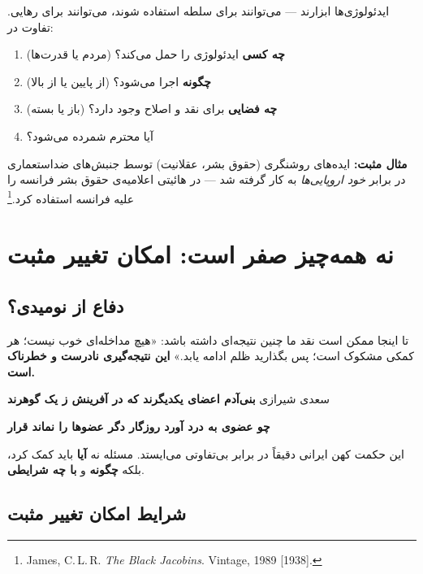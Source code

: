 \begin{tcolorbox}[successbox, title={پاسخ کوتاه: نه}]
ایدئولوژی‌ها ابزارند — می‌توانند برای سلطه استفاده شوند، می‌توانند برای
رهایی. تفاوت در:
\begin{enumerate}
\item \textbf{چه کسی} ایدئولوژی را حمل می‌کند؟ (مردم یا قدرت‌ها)
\item \textbf{چگونه} اجرا می‌شود؟ (از پایین یا از بالا)
\item \textbf{چه فضایی} برای نقد و اصلاح وجود دارد؟ (باز یا بسته)
\item آیا  محترم شمرده می‌شود؟
\end{enumerate}
\textbf{مثال مثبت:} ایده‌های روشنگری (حقوق بشر، عقلانیت) توسط جنبش‌های
ضداستعماری در برابر \textit{خود اروپایی‌ها} به کار گرفته شد —
 در هائیتی اعلامیه‌ی حقوق بشر فرانسه را علیه
فرانسه استفاده کرد.\footnote{James, C.\,L.\,R. \textit{The Black
Jacobins}. Vintage, 1989 [1938].}
\end{tcolorbox}


\section{نه همه‌چیز صفر است: امکان تغییر مثبت}
\label{sec:ch15-not-all-zero}

\subsection{دفاع از نومیدی؟}

تا اینجا ممکن است نقد ما چنین نتیجه‌ای داشته باشد: «هیچ مداخله‌ای خوب
نیست؛ هر کمکی مشکوک است؛ پس بگذارید ظلم ادامه یابد.»
\textbf{این نتیجه‌گیری نادرست و خطرناک است.}

\begin{histQuote}{سعدی شیرازی}
\textbf{بنی‌آدم اعضای یکدیگرند \quad که در آفرینش ز یک گوهرند}

\textbf{چو عضوی به درد آورد روزگار \quad دگر عضوها را نماند قرار}

این حکمت کهن ایرانی دقیقاً در برابر بی‌تفاوتی می‌ایستد. مسئله نه
\textbf{آیا} باید کمک کرد، بلکه \textbf{چگونه} و \textbf{با چه شرایطی}.
\end{histQuote}


\subsection{شرایط امکان تغییر مثبت}

